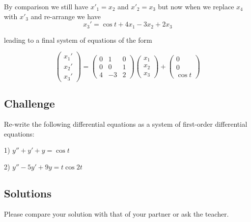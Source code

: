 By comparison we still have $x'_1 = x_2$ and $x'_2 = x_3$ but now when we replace $x_4$ with $x'_3$ and re-arrange we have
\begin{equation}
   x_3' = \cos t + 4 x_1 - 3 x_2 + 2 x_3
\end{equation}

leading to a final system of equations of the form

\begin{equation}
    \left(
        \begin{array}{c}
            x_1' \\
            x_2' \\
            x_3'
        \end{array}
    \right)
    =
    \left(
        \begin{array}{ccc}
            0 & 1 & 0 \\
            0 & 0 & 1 \\
            4 & -3 & 2
        \end{array}
    \right)
    \left(
        \begin{array}{c}
            x_1 \\
            x_2 \\
            x_3
        \end{array}
    \right)
    +
    \left(
        \begin{array}{c}
            0 \\
            0 \\
            \cos t
        \end{array}
    \right)
\end{equation}

\subsection*{Challenge}
Re-write the following differential equations as a system of first-order differential equations:

1) $y'' + y' + y = \cos t$

2) $y'' - 5 y' + 9 y = t \cos 2t$

\subsection*{Solutions}
Please compare your solution with that of your partner or ask the teacher.



\newpage
%
